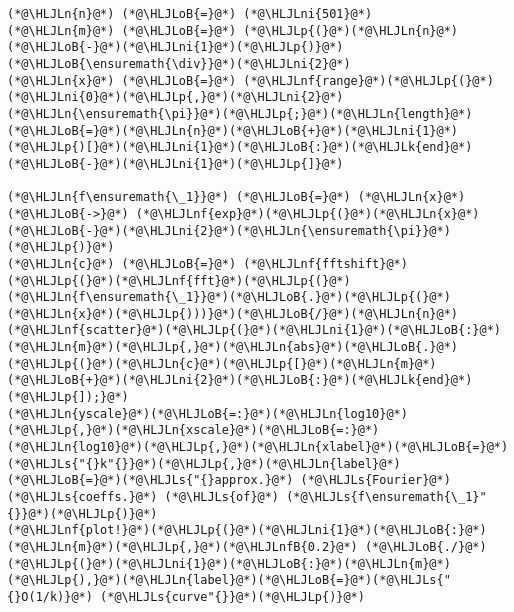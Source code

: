 \documentclass[12pt,a4paper]{article}
\newcommand{\HLJLk}[1]{\textcolor[RGB]{148,91,176}{\textbf{#1}}}
\newcommand{\HLJLn}[1]{#1}
\newcommand{\HLJLnf}[1]{\textcolor[RGB]{66,102,213}{#1}}
\newcommand{\HLJLs}[1]{\textcolor[RGB]{201,61,57}{#1}}
\newcommand{\HLJLnfB}[1]{\textcolor[RGB]{59,151,46}{#1}}
\newcommand{\HLJLni}[1]{\textcolor[RGB]{59,151,46}{#1}}
\newcommand{\HLJLoB}[1]{\textcolor[RGB]{102,102,102}{\textbf{#1}}}
\newcommand{\HLJLp}[1]{#1}
\begin{document}
\begin{lstlisting}
(*@\HLJLn{n}@*) (*@\HLJLoB{=}@*) (*@\HLJLni{501}@*)
(*@\HLJLn{m}@*) (*@\HLJLoB{=}@*) (*@\HLJLp{(}@*)(*@\HLJLn{n}@*)(*@\HLJLoB{-}@*)(*@\HLJLni{1}@*)(*@\HLJLp{)}@*)(*@\HLJLoB{\ensuremath{\div}}@*)(*@\HLJLni{2}@*)
(*@\HLJLn{x}@*) (*@\HLJLoB{=}@*) (*@\HLJLnf{range}@*)(*@\HLJLp{(}@*)(*@\HLJLni{0}@*)(*@\HLJLp{,}@*)(*@\HLJLni{2}@*)(*@\HLJLn{\ensuremath{\pi}}@*)(*@\HLJLp{;}@*)(*@\HLJLn{length}@*)(*@\HLJLoB{=}@*)(*@\HLJLn{n}@*)(*@\HLJLoB{+}@*)(*@\HLJLni{1}@*)(*@\HLJLp{)[}@*)(*@\HLJLni{1}@*)(*@\HLJLoB{:}@*)(*@\HLJLk{end}@*)(*@\HLJLoB{-}@*)(*@\HLJLni{1}@*)(*@\HLJLp{]}@*)

(*@\HLJLn{f\ensuremath{\_1}}@*) (*@\HLJLoB{=}@*) (*@\HLJLn{x}@*) (*@\HLJLoB{->}@*) (*@\HLJLnf{exp}@*)(*@\HLJLp{(}@*)(*@\HLJLn{x}@*)(*@\HLJLoB{-}@*)(*@\HLJLni{2}@*)(*@\HLJLn{\ensuremath{\pi}}@*)(*@\HLJLp{)}@*)
(*@\HLJLn{c}@*) (*@\HLJLoB{=}@*) (*@\HLJLnf{fftshift}@*)(*@\HLJLp{(}@*)(*@\HLJLnf{fft}@*)(*@\HLJLp{(}@*)(*@\HLJLn{f\ensuremath{\_1}}@*)(*@\HLJLoB{.}@*)(*@\HLJLp{(}@*)(*@\HLJLn{x}@*)(*@\HLJLp{)))}@*)(*@\HLJLoB{/}@*)(*@\HLJLn{n}@*)
(*@\HLJLnf{scatter}@*)(*@\HLJLp{(}@*)(*@\HLJLni{1}@*)(*@\HLJLoB{:}@*)(*@\HLJLn{m}@*)(*@\HLJLp{,}@*)(*@\HLJLn{abs}@*)(*@\HLJLoB{.}@*)(*@\HLJLp{(}@*)(*@\HLJLn{c}@*)(*@\HLJLp{[}@*)(*@\HLJLn{m}@*)(*@\HLJLoB{+}@*)(*@\HLJLni{2}@*)(*@\HLJLoB{:}@*)(*@\HLJLk{end}@*)(*@\HLJLp{]);}@*)
(*@\HLJLn{yscale}@*)(*@\HLJLoB{=:}@*)(*@\HLJLn{log10}@*)(*@\HLJLp{,}@*)(*@\HLJLn{xscale}@*)(*@\HLJLoB{=:}@*)(*@\HLJLn{log10}@*)(*@\HLJLp{,}@*)(*@\HLJLn{xlabel}@*)(*@\HLJLoB{=}@*)(*@\HLJLs{"{}k"{}}@*)(*@\HLJLp{,}@*)(*@\HLJLn{label}@*)(*@\HLJLoB{=}@*)(*@\HLJLs{"{}approx.}@*) (*@\HLJLs{Fourier}@*) (*@\HLJLs{coeffs.}@*) (*@\HLJLs{of}@*) (*@\HLJLs{f\ensuremath{\_1}"{}}@*)(*@\HLJLp{)}@*)
(*@\HLJLnf{plot!}@*)(*@\HLJLp{(}@*)(*@\HLJLni{1}@*)(*@\HLJLoB{:}@*)(*@\HLJLn{m}@*)(*@\HLJLp{,}@*)(*@\HLJLnfB{0.2}@*) (*@\HLJLoB{./}@*)(*@\HLJLp{(}@*)(*@\HLJLni{1}@*)(*@\HLJLoB{:}@*)(*@\HLJLn{m}@*)(*@\HLJLp{),}@*)(*@\HLJLn{label}@*)(*@\HLJLoB{=}@*)(*@\HLJLs{"{}O(1/k)}@*) (*@\HLJLs{curve"{}}@*)(*@\HLJLp{)}@*)


\end{lstlisting}
\end{document}
